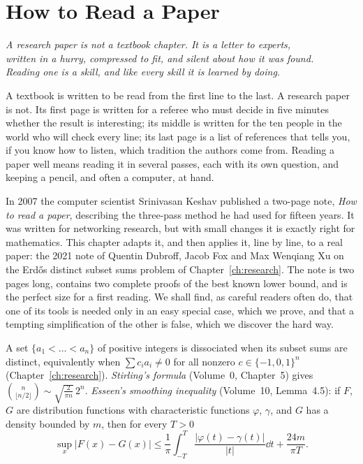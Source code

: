 \chapter{How to Read a Paper}
\label{ch:reading}

\begin{center}\itshape
A research paper is not a textbook chapter. It is a letter to experts,\\
written in a hurry, compressed to fit, and silent about how it was found.\\
Reading one is a skill, and like every skill it is learned by doing.
\end{center}

A textbook is written to be read from the first line to the last. A research paper is not. Its first page is written for a referee
who must decide in five minutes whether the result is interesting; its middle is written for the ten people in the world who will check
every line; its last page is a list of references that tells you, if you know how to listen, which tradition the authors come from.
Reading a paper well means reading it in several passes, each with its own question, and keeping a pencil, and often a computer, at hand.

In 2007 the computer scientist Srinivasan Keshav published a two-page note, \emph{How to read a paper}, describing the three-pass method he
had used for fifteen years. It was written for networking research, but with small changes it is exactly right for mathematics. This chapter
adapts it, and then applies it, line by line, to a real paper: the 2021 note of Quentin Dubroff, Jacob Fox and Max Wenqiang Xu on the Erd\H os
distinct subset sums problem of Chapter~\ref{ch:research}. The note is two pages long, contains two complete proofs of the best known lower bound,
and is the perfect size for a first reading. We shall find, as careful readers often do, that one of its tools is needed only in an easy
special case, which we prove, and that a tempting simplification of the other is false, which we discover the hard way.

\begin{reminder}
A set $\{a_1<\dots<a_n\}$ of positive integers is dissociated when its subset sums are distinct, equivalently when $\sum c_ia_i\ne0$ for all nonzero
$c\in\{-1,0,1\}^n$ (Chapter~\ref{ch:research}). \emph{Stirling's formula} (Volume~0, Chapter~5) gives $\binom n{\lfloor n/2\rfloor}\sim\sqrt{\frac2{\pi n}}\,2^n$. \emph{Esseen's smoothing inequality}
(Volume~10, Lemma~4.5): if $F$, $G$ are distribution functions with characteristic functions $\varphi$, $\gamma$, and $G$ has a density bounded by $m$, then for
every $T>0$
\[
\sup_x|F(x)-G(x)|\le\frac1\pi\int_{-T}^T\frac{|\varphi(t)-\gamma(t)|}{|t|}\dd t+\frac{24m}{\pi T}.
\]
\end{reminder}

